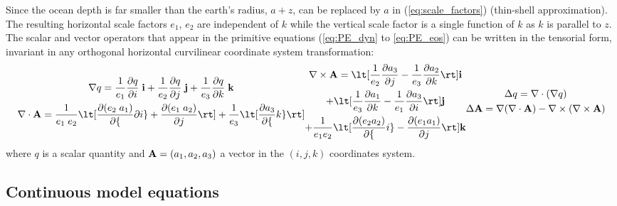 \documentclass[../main/NEMO_manual]{subfiles}
\begin{document}
Since the ocean depth is far smaller than the earth's radius, $a + z$, can be replaced by $a$ in
(\autoref{eq:scale_factors}) (thin-shell approximation).
The resulting horizontal scale factors $e_1$, $e_2$  are independent of $k$ while
the vertical scale factor is a single function of $k$ as $k$ is parallel to $z$.
The scalar and vector operators that appear in the primitive equations
(\autoref{eq:PE_dyn} to \autoref{eq:PE_eos}) can be written in the tensorial form,
invariant in any orthogonal horizontal curvilinear coordinate system transformation:
\begin{subequations}
  \begin{gather}
    \label{eq:PE_grad}
    \nabla q =   \frac{1}{e_1} \pd[q]{i} \; \vect i
               + \frac{1}{e_2} \pd[q]{j} \; \vect j
               + \frac{1}{e_3} \pd[q]{k} \; \vect k \\
    \label{eq:PE_div}
    \nabla \cdot \vect A =   \frac{1}{e_1 \; e_2} \lt[ \pd[(e_2 \; a_1)]{\partial i} + \pd[(e_1 \; a_2)]{j} \rt]
                           + \frac{1}{e_3} \lt[ \pd[a_3]{k} \rt]
  \end{gather}
  \begin{multline}
    \label{eq:PE_curl}
      \nabla \times \vect{A} =   \lt[ \frac{1}{e_2} \pd[a_3]{j} - \frac{1}{e_3} \pd[a_2]{k}   \rt] \vect i \\
                               + \lt[ \frac{1}{e_3} \pd[a_1]{k} - \frac{1}{e_1} \pd[a_3]{i}   \rt] \vect j \\
                               + \frac{1}{e_1 e_2} \lt[ \pd[(e_2 a_2)]{i} - \pd[(e_1 a_1)]{j} \rt] \vect k
  \end{multline}
  \begin{gather}
    \label{eq:PE_lap}
    \Delta q = \nabla \cdot (\nabla q) \\
    \label{eq:PE_lap_vector}
    \Delta \vect A = \nabla (\nabla \cdot \vect A) - \nabla \times (\nabla \times \vect A)
  \end{gather}
\end{subequations}
where $q$ is a scalar quantity and $\mathbf{A} = (a_1,a_2,a_3)$ a vector in the $(i,j,k)$ coordinates system.

\subsection{Continuous model equations}
\label{subsec:PE_zco_Eq}
\end{document}
